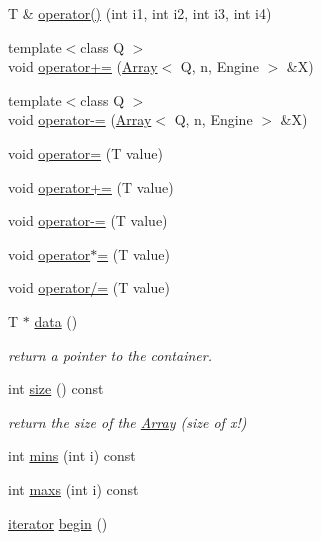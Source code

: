 \begin{DoxyCompactItemize}
\item 
T \& \hyperlink{classArrays_1_1Array_adb1651cbe94b70cdadedf0a8736faa85}{operator()} (int i1, int i2, int i3, int i4)
\item 
{\footnotesize template$<$class Q $>$ }\\void \hyperlink{classArrays_1_1Array_ab5639cf793ece6f0481d3d0584b98f1a}{operator+=} (\hyperlink{classArrays_1_1Array}{Array}$<$ Q, n, Engine $>$ \&X)
\item 
{\footnotesize template$<$class Q $>$ }\\void \hyperlink{classArrays_1_1Array_a46c503e496e946a962d2ca5c55e4c33d}{operator-\/=} (\hyperlink{classArrays_1_1Array}{Array}$<$ Q, n, Engine $>$ \&X)
\item 
void \hyperlink{classArrays_1_1Array_a7c260140351a11af33177d34a7d2560b}{operator=} (T value)
\item 
void \hyperlink{classArrays_1_1Array_add2d1198cbaa8362b45846cd4967187e}{operator+=} (T value)
\item 
void \hyperlink{classArrays_1_1Array_ac1c079a4dbec830f0dddbcf4025c5942}{operator-\/=} (T value)
\item 
void \hyperlink{classArrays_1_1Array_a1e2f8f400e087632f874d4f7cbba68c6}{operator$\ast$=} (T value)
\item 
void \hyperlink{classArrays_1_1Array_afa1898b34feab9e5e9c58aad315604c9}{operator/=} (T value)
\item 
T $\ast$ \hyperlink{classArrays_1_1Array_aa9b5f75873b03d2f352452880c9fcd75}{data} ()
\begin{DoxyCompactList}\small\item\em return a pointer to the container. \end{DoxyCompactList}\item 
int \hyperlink{classArrays_1_1Array_aecc5d0a4a5c7b47c573ac2dc0f9f0e57}{size} () const 
\begin{DoxyCompactList}\small\item\em return the size of the \hyperlink{classArrays_1_1Array}{Array} (size of x!) \end{DoxyCompactList}\item 
int \hyperlink{classArrays_1_1Array_a6474631e748c978bd5ba8168a8a8f8fe}{mins} (int i) const 
\item 
int \hyperlink{classArrays_1_1Array_adb81b81a8a73f1b108218847638391d2}{maxs} (int i) const 
\item 
\hyperlink{classArrays_1_1Array_abbad078205d9e12b2aedc8599372edf1}{iterator} \hyperlink{classArrays_1_1Array_a2fa0a02374ec0acd2a71a3822db4477f}{begin} ()

\end{DoxyCompactItemize}
